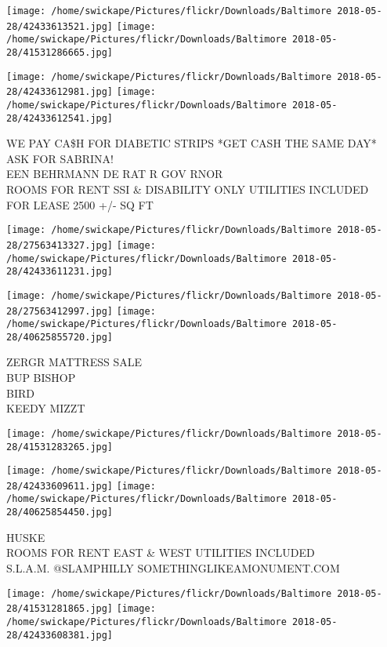 \documentclass[10pt,letterpaper]{article}
\begin{document}
\texttt{[image: /home/swickape/Pictures/flickr/Downloads/Baltimore 2018-05-28/42433613521.jpg]}
\texttt{[image: /home/swickape/Pictures/flickr/Downloads/Baltimore 2018-05-28/41531286665.jpg]}

\texttt{[image: /home/swickape/Pictures/flickr/Downloads/Baltimore 2018-05-28/42433612981.jpg]}
\texttt{[image: /home/swickape/Pictures/flickr/Downloads/Baltimore 2018-05-28/42433612541.jpg]}

WE PAY CA\$H FOR DIABETIC STRIPS *GET CASH THE SAME DAY* ASK FOR SABRINA!\\
EEN BEHRMANN DE RAT R GOV RNOR\\
ROOMS FOR RENT SSI \& DISABILITY ONLY UTILITIES INCLUDED\\
FOR LEASE 2500 +/{-} SQ FT
\pagebreak

\texttt{[image: /home/swickape/Pictures/flickr/Downloads/Baltimore 2018-05-28/27563413327.jpg]}
\texttt{[image: /home/swickape/Pictures/flickr/Downloads/Baltimore 2018-05-28/42433611231.jpg]}

\texttt{[image: /home/swickape/Pictures/flickr/Downloads/Baltimore 2018-05-28/27563412997.jpg]}
\texttt{[image: /home/swickape/Pictures/flickr/Downloads/Baltimore 2018-05-28/40625855720.jpg]}

ZERGR MATTRESS SALE\\
BUP BISHOP\\
BIRD\\
KEEDY MIZZT
\pagebreak

\texttt{[image: /home/swickape/Pictures/flickr/Downloads/Baltimore 2018-05-28/41531283265.jpg]}

\vspace{0.25in}
\texttt{[image: /home/swickape/Pictures/flickr/Downloads/Baltimore 2018-05-28/42433609611.jpg]}
\texttt{[image: /home/swickape/Pictures/flickr/Downloads/Baltimore 2018-05-28/40625854450.jpg]}

HUSKE\\
ROOMS FOR RENT EAST \& WEST UTILITIES INCLUDED\\
S.L.A.M. @SLAMPHILLY SOMETHINGLIKEAMONUMENT.COM
\pagebreak

\texttt{[image: /home/swickape/Pictures/flickr/Downloads/Baltimore 2018-05-28/41531281865.jpg]}
\texttt{[image: /home/swickape/Pictures/flickr/Downloads/Baltimore 2018-05-28/42433608381.jpg]}
\end{document}
